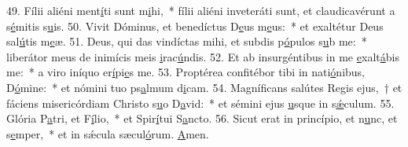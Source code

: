 49. Fílii aliéni ment\uline{í}ti sunt m\uline{i}hi,~* fílii aliéni inveteráti sunt, et claudicavérunt a s\uline{é}mitis s\uline{u}is.
50. Vivit Dóminus, et benedíctus D\uline{e}us m\uline{e}us:~* et exaltétur Deus sal\uline{ú}tis m\uline{e}æ.
51. Deus, qui das vindíctas mihi, et subdis p\uline{ó}pulos s\uline{u}b me:~* liberátor meus de inimícis meis \uline{i}rac\uline{ú}ndis.
52. Et ab insurgéntibus in me \uline{e}xalt\uline{á}bis me:~* a viro iníquo er\uline{í}pi\uline{e}s me.
53. Proptérea confitébor tibi in nati\uline{ó}nibus, D\uline{ó}mine:~* et nómini tuo ps\uline{a}lmum d\uline{i}cam.
54. Magníficans salútes Regis ejus,~† et fáciens misericórdiam Christo s\uline{u}o D\uline{a}vid:~* et sémini ejus \uline{u}sque in s\uline{ǽ}culum.
55. Glória P\uline{a}tri, et F\uline{í}lio,~* et Spir\uline{í}tui S\uline{a}ncto.
56. Sicut erat in princípio, et n\uline{u}nc, et s\uline{e}mper,~* et in sǽcula sæcul\uline{ó}rum. \uline{A}men.
